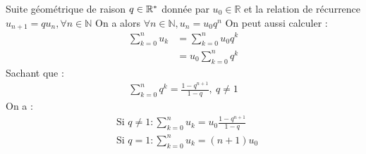 \begin{graybox}
    \begin{proposition}
    Suite géométrique de raison $q \in \mathbb{R}^*$ donnée par $u_0 \in \mathbb{R}$ et la relation de récurrence $u_{n+1} = q u_n, \forall n \in \mathbb{N}$
	       On a alors $\forall n \in \mathbb{N}, u_n = u_0 q^n$
	       On peut aussi calculer :
        	\begin{align*}
        	\sum_{k=0}^{n}u_k &= \sum_{k=0}^{n} u_0 q^k \\
        					  &= u_0 \sum_{k=0}^{n}q^k	
        	\end{align*}        
            Sachant que : 
            \begin{align*}
                	\sum_{k=0}^{n} q^k = \frac{1 - q^{n+1}}{1 - q}, \ q\neq 1
            \end{align*}
            On a :
            	\begin{align*}
            	&\text{Si }q\neq 1 :  \sum_{k=0}^{n}u_k = u_0 \frac{1 - q^{n+1}}{1 - q} \\
            	&\text{Si } q = 1 : \sum_{k=0}^{n}u_k = (n+1)u_0
            	\end{align*}
\end{proposition}
\end{graybox}

